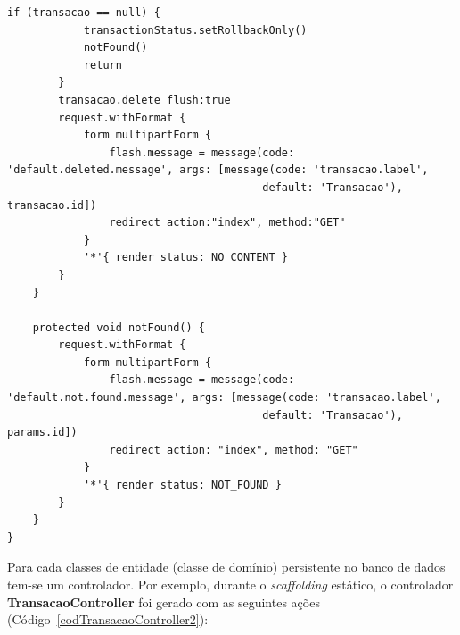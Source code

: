 \begin{lstlisting}[caption=Controlador {\bf TransacaoController},
    frame = trBL, float=htbp, label=codTransacaoController2]
        if (transacao == null) {
            transactionStatus.setRollbackOnly()
            notFound()
            return
        }
        transacao.delete flush:true
        request.withFormat {
            form multipartForm {
                flash.message = message(code: 'default.deleted.message', args: [message(code: 'transacao.label', 
                                        default: 'Transacao'), transacao.id])
                redirect action:"index", method:"GET"
            }
            '*'{ render status: NO_CONTENT }
        }
    }

    protected void notFound() {
        request.withFormat {
            form multipartForm {
                flash.message = message(code: 'default.not.found.message', args: [message(code: 'transacao.label', 
                                        default: 'Transacao'), params.id])
                redirect action: "index", method: "GET"
            }
            '*'{ render status: NOT_FOUND }
        }
    }
}
\end{lstlisting}

Para cada classes de entidade (classe  de domínio) persistente no banco de dados
tem-se  um controlador.  Por exemplo,  durante o  {\it scaffolding}  estático, o
controlador  {\bf  TransacaoController}  foi   gerado  com  as  seguintes  ações
(Código~\ref{codTransacaoController2}):

